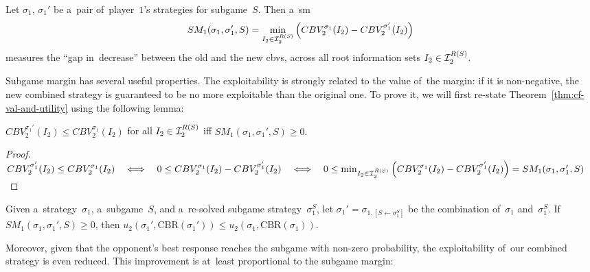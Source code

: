 \begin{defn}[\acrlong{sm}]
  Let $\sigma_1$, $\sigma_1'$ be a~pair of~player~$1$'s strategies for subgame~$S$.
  Then a~\acrlong{sm}
  \[
    SM_1 (\sigma_1, \sigma_1' , S) =
    \min_{I_2 \in \mathcal{I}_2^{R(S)}}
    \left( CBV_2^{\sigma_1} (I_2) - CBV_2^{\sigma_1'} (I_2) \right)
  \]
  measures the ``gap in~decrease'' between the old and the new \acrlong{cbv}s, across all root information sets $I_2 \in \mathcal{I}_2^{R(S)}$.
\end{defn}

Subgame margin has several useful properties.
The exploitability is strongly related to the value of~the margin:
if it is non-negative, the new combined strategy is guaranteed to be no more exploitable than the original one.
To prove it, we will first re-state Theorem~\ref{thm:cf-val-and-utility} using the following lemma:
\begin{lem}
  \label{lem:cbv-and-sm}
  $CBV_2^{\sigma_1'} (I_2) \leq CBV_2^{\sigma_1} (I_2)$ for all $I_2 \in \mathcal{I}_2^{R(S)}$
  iff
  $SM_1 (\sigma_1, \sigma_1' , S) \geq 0.$
\end{lem}
\begin{proof}
  $
  CBV_2^{\sigma_1'} (I_2) \leq CBV_2^{\sigma_1} (I_2)
  \quad \Longleftrightarrow \quad
  0 \leq CBV_2^{\sigma_1} (I_2) - CBV_2^{\sigma_1'} (I_2)
  \quad \Longleftrightarrow \quad
  0 \leq \min_{I_2 \in \mathcal{I}_2^{R(S)}} \left( CBV_2^{\sigma_1} (I_2) - CBV_2^{\sigma_1'} (I_2) \right)
  = SM_1 (\sigma_1, \sigma_1' , S)
  $
\end{proof}

\begin{cor}
  \label{cor:sm-and-utility}
  Given a~strategy~$\sigma_1$, a~subgame~$S$, and a~re-solved subgame strategy~$\sigma_1^S$, let $\sigma_1' = \sigma_{1, [S \leftarrow \sigma_1^S]}$ be the combination of~$\sigma_1$ and~$\sigma_1^S$.
  If $SM_1 (\sigma_1, \sigma_1' , S) \geq 0$, then $u_2(\sigma_1', \textrm{CBR}(\sigma_1')) \leq  u_2(\sigma_1, \textrm{CBR}(\sigma_1))$.
\end{cor}

Moreover, given that the opponent's best response reaches the subgame with non-zero probability, the exploitability of~our combined strategy is even reduced.
This improvement is at~least proportional to the subgame margin:

